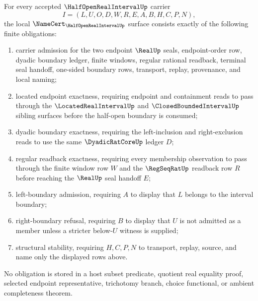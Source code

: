 \begin{theorem}
\label{thm:half-open-real-interval-namecert-obligations}
For every accepted $\HalfOpenRealIntervalUp$ carrier
$$
I=(L,U,O,D,W,R,E,A,B,H,C,P,N),
$$
the local $\NameCert_{\HalfOpenRealIntervalUp}$ surface consists exactly of the following finite obligations:
\begin{enumerate}
\item carrier admission for the two endpoint $\RealUp$ seals, endpoint-order row, dyadic boundary ledger, finite windows, regular rational readback, terminal seal handoff, one-sided boundary rows, transport, replay, provenance, and local naming;
\item located endpoint exactness, requiring endpoint and containment reads to pass through the $\LocatedRealIntervalUp$ and $\ClosedBoundedIntervalUp$ sibling surfaces before the half-open boundary is consumed;
\item dyadic boundary exactness, requiring the left-inclusion and right-exclusion reads to use the same $\DyadicRatCoreUp$ ledger $D$;
\item regular readback exactness, requiring every membership observation to pass through the finite window row $W$ and the $\RegSeqRatUp$ readback row $R$ before reaching the $\RealUp$ seal handoff $E$;
\item left-boundary admission, requiring $A$ to display that $L$ belongs to the interval boundary;
\item right-boundary refusal, requiring $B$ to display that $U$ is not admitted as a member unless a stricter below-$U$ witness is supplied;
\item structural stability, requiring $H,C,P,N$ to transport, replay, source, and name only the displayed rows above.
\end{enumerate}
No obligation is stored in a host subset predicate, quotient real equality proof, selected endpoint representative, trichotomy branch, choice functional, or ambient completeness theorem.
\end{theorem}
